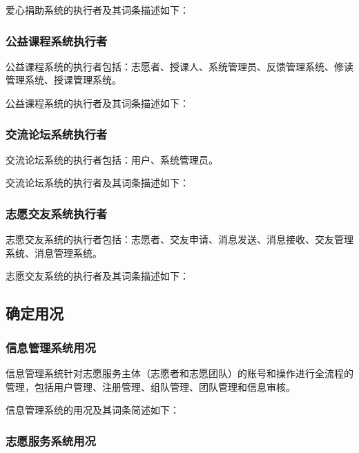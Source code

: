 爱心捐助系统的执行者及其词条描述如下：


\subsubsection{公益课程系统执行者}

公益课程系统的执行者包括：志愿者、授课人、系统管理员、反馈管理系统、修读管理系统、授课管理系统。

公益课程系统的执行者及其词条描述如下：



\subsubsection{交流论坛系统执行者}

交流论坛系统的执行者包括：用户、系统管理员。

交流论坛系统的执行者及其词条描述如下：



\subsubsection{志愿交友系统执行者}

志愿交友系统的执行者包括：志愿者、交友申请、消息发送、消息接收、交友管理系统、消息管理系统。

志愿交友系统的执行者及其词条描述如下：



\subsection{确定用况}

\subsubsection{信息管理系统用况}

信息管理系统针对志愿服务主体（志愿者和志愿团队）的账号和操作进行全流程的管理，包括用户管理、注册管理、组队管理、团队管理和信息审核。

信息管理系统的用况及其词条简述如下：


\subsubsection{志愿服务系统用况}


